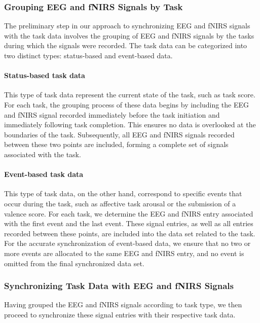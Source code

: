 \subsubsection{Grouping EEG and fNIRS Signals by Task}

The preliminary step in our approach to synchronizing EEG and fNIRS signals with the task data involves the grouping of EEG and fNIRS signals by the tasks during which the signals were recorded. The task data can be categorized into two distinct types: status-based and event-based data.

\paragraph{Status-based task data} This type of task data represent the current state of the task, such as task score. For each task, the grouping process of these data begins by including the EEG and fNIRS signal recorded immediately before the task initiation and immediately following task completion. This ensures no data is overlooked at the boundaries of the task. Subsequently, all EEG and fNIRS signals recorded between these two points are included, forming a complete set of signals associated with the task.

\paragraph{Event-based task data} This type of task data, on the other hand, correspond to specific events that occur during the task, such as affective task arousal or the submission of a valence score. For each task, we determine the EEG and fNIRS entry associated with the first event and the last event. These signal entries, as well as all entries recorded between these points, are included into the data set related to the task. For the accurate synchronization of event-based data, we ensure that no two or more events are allocated to the same EEG and fNIRS entry, and no event is omitted from the final synchronized data set.

\subsubsection{Synchronizing Task Data with EEG and fNIRS Signals}

Having grouped the EEG and fNIRS signals according to task type, we then proceed to synchronize these signal entries with their respective task data.

